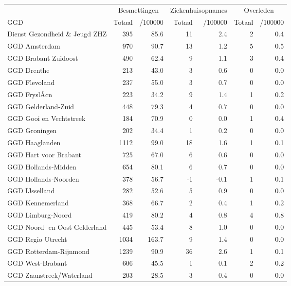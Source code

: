 \documentclass[
  english,
  man,floatsintext]{apa6}
\begin{document}
\begin{table}
\centering\begingroup\fontsize{10}{12}\selectfont

\begin{threeparttable}
\begin{tabular}{lrrrrrr}
\toprule
\multicolumn{1}{c}{ } & \multicolumn{2}{c}{Besmettingen} & \multicolumn{2}{c}{Ziekenhuisopnames} & \multicolumn{2}{c}{Overleden} \\
\cmidrule(l{3pt}r{3pt}){2-3} \cmidrule(l{3pt}r{3pt}){4-5} \cmidrule(l{3pt}r{3pt}){6-7}
GGD & Totaal & /100000 & Totaal & /100000 & Totaal & /100000\\
\midrule
Dienst Gezondheid \& Jeugd ZHZ & 395 & 85.6 & 11 & 2.4 & 2 & 0.4\\
GGD Amsterdam & 970 & 90.7 & 13 & 1.2 & 5 & 0.5\\
GGD Brabant-Zuidoost & 490 & 62.4 & 9 & 1.1 & 3 & 0.4\\
GGD Drenthe & 213 & 43.0 & 3 & 0.6 & 0 & 0.0\\
GGD Flevoland & 237 & 55.0 & 3 & 0.7 & 0 & 0.0\\
GGD FryslÃ¢n & 223 & 34.2 & 9 & 1.4 & 1 & 0.2\\
GGD Gelderland-Zuid & 448 & 79.3 & 4 & 0.7 & 0 & 0.0\\
GGD Gooi en Vechtstreek & 184 & 70.9 & 0 & 0.0 & 1 & 0.4\\
GGD Groningen & 202 & 34.4 & 1 & 0.2 & 0 & 0.0\\
GGD Haaglanden & 1112 & 99.0 & 18 & 1.6 & 1 & 0.1\\
GGD Hart voor Brabant & 725 & 67.0 & 6 & 0.6 & 0 & 0.0\\
GGD Hollands-Midden & 654 & 80.1 & 6 & 0.7 & 0 & 0.0\\
GGD Hollands-Noorden & 378 & 56.7 & -1 & -0.1 & 1 & 0.1\\
GGD IJsselland & 282 & 52.6 & 5 & 0.9 & 0 & 0.0\\
GGD Kennemerland & 368 & 66.7 & 2 & 0.4 & 1 & 0.2\\
GGD Limburg-Noord & 419 & 80.2 & 4 & 0.8 & 4 & 0.8\\
GGD Noord- en Oost-Gelderland & 445 & 53.4 & 8 & 1.0 & 0 & 0.0\\
GGD Regio Utrecht & 1034 & 163.7 & 9 & 1.4 & 0 & 0.0\\
GGD Rotterdam-Rijnmond & 1239 & 90.9 & 36 & 2.6 & 1 & 0.1\\
GGD West-Brabant & 606 & 45.5 & 1 & 0.1 & 2 & 0.2\\
GGD Zaanstreek/Waterland & 203 & 28.5 & 3 & 0.4 & 0 & 0.0\\

\end{tabular}
\end{threeparttable}
\end{table}
\end{document}
